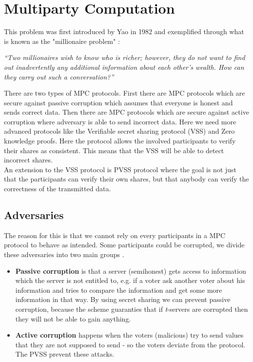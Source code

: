 \section{Multiparty Computation}
This problem was first introduced by Yao in 1982 and exemplified through what is known as the "millionaire problem" \cite{Yao82}:

\begin{center}
\textit{“Two millionaires wish to know who is richer; however, they do not want to find out inadvertently any additional information about each other’s wealth. How can they carry out such a conversation?”}
\end{center}

\noindent
There are two types of MPC protocols. First there are MPC protocols which are secure against passive corruption which assumes that everyone is honest and sends correct data. Then there are MPC protocols which are secure against active corruption where adversary is able to send incorrect data. Here we need more advanced protocols like the Verifiable secret sharing protocol (VSS) and Zero knowledge proofs. Here the protocol allows the involved participants to verify their shares as consistent. This means that the VSS will be able to detect incorrect shares. \\



\noindent
An extension to the VSS protocol is PVSS protocol where the goal is not just that the participants can verify their own shares, but that anybody can verify the correctness of the transmitted data. 

\subsection{Adversaries}
The reason for this is that we cannot rely on every participants in a MPC protocol to behave as intended. Some participants could be corrupted, we divide these adversaries into two main groups \cite{IntroCrypto}. 

\begin{itemize}
\item \textbf{Passive corruption} is that a server (semihonest) gets access to information which the server is not entitled to, e.g. if a voter ask another voter about his information and tries to compare the information and get some more information in that way. By using secret sharing we can prevent passive corruption, because the scheme guaranties that if \textit{t}-servers are corrupted then they will not be able to gain anything.

\item \textbf{Active corruption} happens when the voters (malicious) try to send values that they are not supposed to send - so the voters deviate from the protocol. The PVSS prevent these attacks.
\end{itemize}
